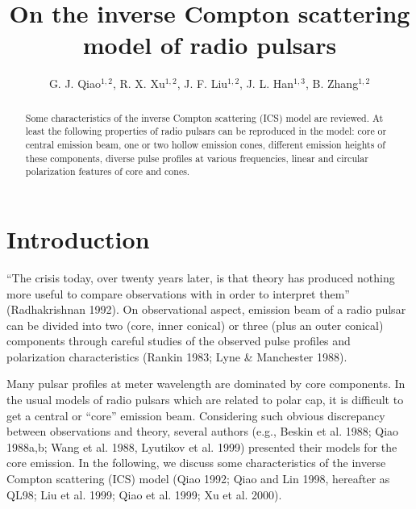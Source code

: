 \pagestyle{myheadings}


\title{On the inverse Compton scattering model of radio pulsars}

\author{G. J. Qiao$^{1,2}$,
        R. X. Xu$^{1,2}$,
        J. F. Liu$^{1,2}$,
        J. L. Han$^{1,3}$,
        B. Zhang$^{1,2}$}



\begin{abstract}

Some characteristics of the inverse Compton scattering (ICS) model
are reviewed. At least the following properties of radio pulsars
can be reproduced in the model: core or central emission beam, one
or two hollow emission cones, different emission heights of these
components, diverse pulse profiles at various frequencies, linear
and circular polarization features of core and cones.

\end{abstract}

\section{Introduction}

``The crisis today, over twenty years later, is that theory has
produced nothing more useful to compare observations with in order
to interpret them'' (Radhakrishnan 1992). On observational aspect,
emission beam of a radio pulsar can be divided into two (core,
inner conical) or three (plus an outer conical) components through
careful studies of the observed pulse profiles and polarization
characteristics (Rankin 1983; Lyne \& Manchester 1988).

Many pulsar profiles at meter wavelength are dominated by core
components. In the usual models of radio pulsars which are related
to polar cap, it is difficult to get a central or ``core''
emission beam. Considering such obvious discrepancy between
observations and theory, several authors (e.g., Beskin et al.
1988; Qiao 1988a,b; Wang et al. 1988, Lyutikov et al. 1999)
presented their models for the core emission. In the following, we
discuss some characteristics of the inverse Compton scattering
(ICS) model (Qiao 1992; Qiao and Lin 1998, hereafter as QL98; Liu
et al. 1999; Qiao et al. 1999; Xu et al. 2000).


